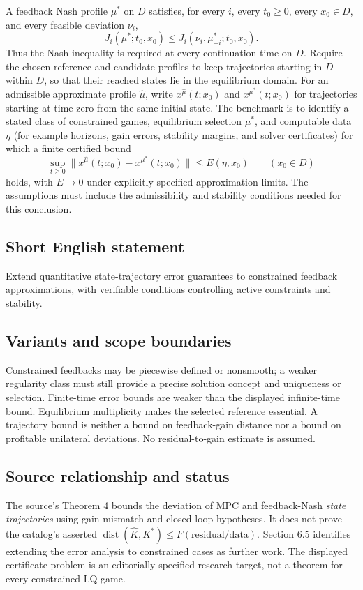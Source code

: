\documentclass[11pt,a4paper]{article}
\begin{document}
A feedback Nash profile $\mu^*$ on $D$ satisfies, for every $i$, every $t_0\geq0$, every $x_0\in D$, and every feasible deviation $\nu_i$,
\[
 J_i(\mu^*;t_0,x_0)\leq J_i(\nu_i,\mu^*_{-i};t_0,x_0).
\]
Thus the Nash inequality is required at every continuation time on $D$. Require the chosen reference and candidate profiles to keep trajectories starting in $D$ within $D$, so that their reached states lie in the equilibrium domain. For an admissible approximate profile $\widehat\mu$, write
$x^{\widehat\mu}(t;x_0)$ and $x^{\mu^*}(t;x_0)$ for trajectories starting at time zero from the same initial state. The benchmark is to identify a stated class of constrained games, equilibrium selection $\mu^*$, and computable data $\eta$ (for example horizons, gain errors, stability margins, and solver certificates) for which a finite certified bound
\[
 \sup_{t\geq0}\|x^{\widehat\mu}(t;x_0)-x^{\mu^*}(t;x_0)\|
      \leq E(\eta,x_0)\qquad(x_0\in D)
\]
holds, with $E\to0$ under explicitly specified approximation limits. The assumptions must include the admissibility and stability conditions needed for this conclusion.

\subsection*{Short English statement}
Extend quantitative state-trajectory error guarantees to constrained feedback approximations, with verifiable conditions controlling active constraints and stability.

\subsection*{Variants and scope boundaries}
Constrained feedbacks may be piecewise defined or nonsmooth; a weaker regularity class must still provide a precise solution concept and uniqueness or selection. Finite-time error bounds are weaker than the displayed infinite-time bound. Equilibrium multiplicity makes the selected reference essential. A trajectory bound is neither a bound on feedback-gain distance nor a bound on profitable unilateral deviations. No residual-to-gain estimate is assumed.

\subsection*{Source relationship and status}
The source's Theorem 4 bounds the deviation of MPC and feedback-Nash \emph{state trajectories} using gain mismatch and closed-loop hypotheses. It does not prove the catalog's asserted $\operatorname{dist}(\widehat K,K^*)\leq F(\text{residual/data})$. Section 6.5 identifies extending the error analysis to constrained cases as further work. The displayed certificate problem is an editorially specified research target, not a theorem for every constrained LQ game.
\end{document}
